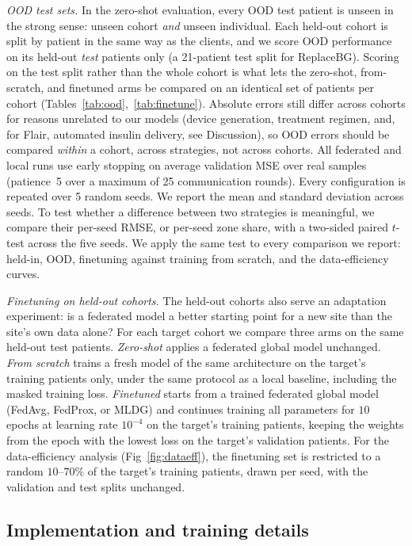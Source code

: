 \documentclass[10pt,letterpaper]{article}
\begin{document}
\emph{OOD test sets.} In the zero-shot evaluation, every OOD test patient is
unseen in the strong sense: unseen cohort \emph{and} unseen individual. Each
held-out cohort is split by patient in
the same way as the clients, and we score OOD performance on its held-out
\emph{test} patients only (a 21-patient test split for ReplaceBG). Scoring on the
test split rather than the whole cohort is what lets the zero-shot, from-scratch,
and finetuned arms be compared on an identical set of patients per cohort
(Tables~\ref{tab:ood},~\ref{tab:finetune}). Absolute errors still differ across
cohorts for reasons unrelated to our models (device generation, treatment
regimen, and, for Flair, automated insulin delivery, see Discussion), so OOD
errors should be compared \emph{within} a cohort, across strategies, not across
cohorts. All federated and local runs use early stopping on average
validation MSE over real samples (patience~5 over a maximum of 25
communication rounds). Every configuration is repeated over 5 random seeds. We report the mean and standard
deviation across seeds. To test whether a difference between two strategies is
meaningful, we compare their per-seed RMSE, or per-seed zone share, with a
two-sided paired $t$-test across the five seeds. We apply the same test to
every comparison we report:
held-in, OOD, finetuning against training from scratch, and the data-efficiency
curves.

\emph{Finetuning on held-out cohorts.} The held-out cohorts also serve an
adaptation experiment: is a federated model a better starting point for a new
site than the site's own data alone? For each target cohort we compare three
arms on the same held-out test patients. \emph{Zero-shot} applies a federated
global model unchanged. \emph{From scratch} trains a fresh model of the same
architecture on the target's training patients only, under the same protocol
as a local baseline, including the masked training loss. \emph{Finetuned}
starts from a trained federated global
model (FedAvg, FedProx, or MLDG) and continues training all parameters for
$10$ epochs at learning rate $10^{-4}$ on the target's training patients,
keeping the weights from the epoch with the lowest loss on the target's
validation patients. For the data-efficiency analysis (Fig~\ref{fig:dataeff}),
the finetuning set is restricted to a random $10$--$70\%$ of the target's
training patients, drawn per seed, with the validation and test splits
unchanged.

\subsection*{Implementation and training details}
\end{document}
